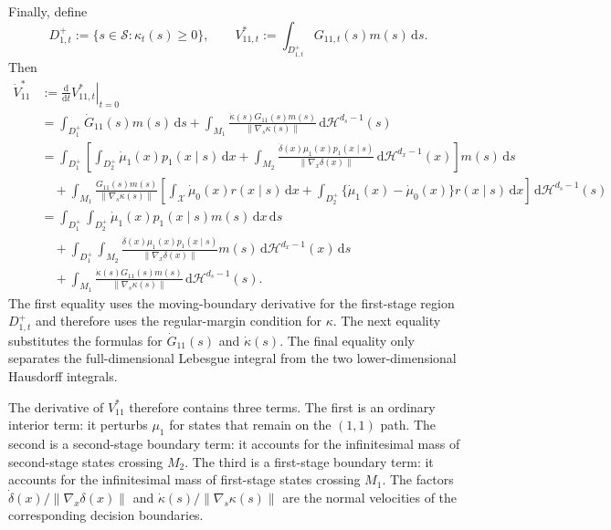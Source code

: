 \documentclass[12pt]{article}
\newcommand{\1}{\mathbf{1}}
\begin{document}
Finally, define
\[
D_{1,t}^+ := \{s\in\mathcal S:\kappa_t(s)\geq 0\},
\qquad
V_{11,t}^*
:=
\int_{D_{1,t}^+}G_{11,t}(s)m(s)\,\mathrm ds.
\]
Then
\begin{align*}
\dot V_{11}^*
&:=
\left.\frac{\mathrm d}{\mathrm dt}V_{11,t}^*\right|_{t=0} \\
&=
\int_{D_1^+}\dot G_{11}(s)m(s)\,\mathrm ds
+
\int_{M_1}
\frac{\dot\kappa(s)G_{11}(s)m(s)}
{\lVert\nabla_s\kappa(s)\rVert}
\,\mathrm d\mathcal H^{d_s-1}(s) \\
&=
\int_{D_1^+}
\left[
\int_{D_2^+}\dot\mu_1(x)p_1(x\mid s)\,\mathrm dx
+
\int_{M_2}
\frac{\dot\delta(x)\mu_1(x)p_1(x\mid s)}
{\lVert\nabla_x\delta(x)\rVert}
\,\mathrm d\mathcal H^{d_x-1}(x)
\right]
m(s)\,\mathrm ds \\
&\quad+
\int_{M_1}
\frac{G_{11}(s)m(s)}
{\lVert\nabla_s\kappa(s)\rVert}
\left[
\int_{\mathcal X}\dot\mu_0(x)r(x\mid s)\,\mathrm dx
+
\int_{D_2^+}\{\dot\mu_1(x)-\dot\mu_0(x)\}r(x\mid s)\,\mathrm dx
\right]
\,\mathrm d\mathcal H^{d_s-1}(s) \\
&=
\int_{D_1^+}\int_{D_2^+}
\dot\mu_1(x)p_1(x\mid s)m(s)\,\mathrm dx\,\mathrm ds \\
&\quad+
\int_{D_1^+}\int_{M_2}
\frac{\dot\delta(x)\mu_1(x)p_1(x\mid s)}
{\lVert\nabla_x\delta(x)\rVert}
m(s)
\,\mathrm d\mathcal H^{d_x-1}(x)\,\mathrm ds \\
&\quad+
\int_{M_1}
\frac{\dot\kappa(s)G_{11}(s)m(s)}
{\lVert\nabla_s\kappa(s)\rVert}
\,\mathrm d\mathcal H^{d_s-1}(s).
\end{align*}
The first equality uses the moving-boundary derivative for the first-stage
region $D_{1,t}^+$ and therefore uses the regular-margin condition for
$\kappa$. The next equality substitutes the formulas for $\dot G_{11}(s)$ and
$\dot\kappa(s)$. The final equality only separates the full-dimensional
Lebesgue integral from the two lower-dimensional Hausdorff integrals.

The derivative of $V_{11}^*$ therefore contains three terms. The first is an
ordinary interior term: it perturbs $\mu_1$ for states that remain on the
$(1,1)$ path. The second is a second-stage boundary term: it accounts for the
infinitesimal mass of second-stage states crossing $M_2$. The third is a
first-stage boundary term: it accounts for the infinitesimal mass of
first-stage states crossing $M_1$. The factors
$\dot\delta(x)/\lVert\nabla_x\delta(x)\rVert$ and
$\dot\kappa(s)/\lVert\nabla_s\kappa(s)\rVert$ are the normal velocities of
the corresponding decision boundaries.
\end{document}
